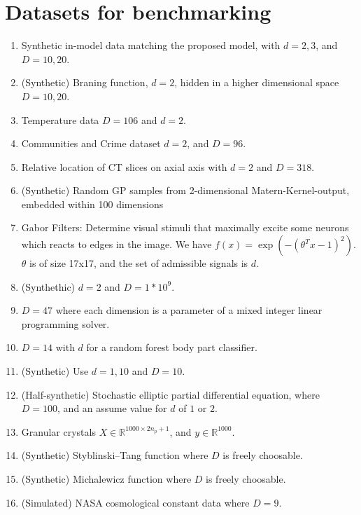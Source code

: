 \section{Datasets for benchmarking}

\begin{enumerate}
\item \citep{Garnett2013} Synthetic in-model data matching the proposed model, with $d=2, 3$, and $D=10, 20$.
\item \citep{Garnett2013} (Synthetic) Braning function, $d=2$, hidden in a higher dimensional space $D=10, 20$.
\item \citep{Garnett2013} Temperature data $D=106$ and $d=2$.
\item \citep{Garnett2013} Communities and Crime dataset $d=2$, and $D=96$. 
\item \citep{Garnett2013} Relative location of CT slices on axial axis with $d = 2$ and $D=318$. 
\item \citep{Djolonga2013} (Synthetic) Random GP samples from 2-dimensional Matern-Kernel-output, embedded within 100 dimensions
\item \citep{Djolonga2013} Gabor Filters: Determine visual stimuli that maximally excite some neurons which reacts to edges in the image.
We have $f(x) = \exp( -( \theta^T x - 1 )^2 )$. $\theta$ is of size 17x17, and the set of admissible signals is $d$.
\item \citep{Wang2013} (Synthethic) $d=2$ and $D=1*10^9$.
\item \citep{Wang2013} $D=47$ where each dimension is a parameter of a mixed integer linear programming solver.
\item \citep{Wang2013} $D=14$ with $d$ for a random forest body part classifier.
\item \citep{Tripathy}  (Synthetic) Use $d=1,10$ and $D=10$.
\item \citep{Tripathy} (Half-synthetic) Stochastic elliptic partial differential equation, where $D=100$, and an assume value for $d$ of $1$ or $2$.
\item \citep{Tripathy} Granular crystals $X \in \mathbb{R}^{1000 \times 2n_p +1}$, and $y \in \mathbb{R}^{1000}$.
\item \citep{Gardner2017} (Synthetic) Styblinski–Tang function where $D$ is freely choosable.
\item \citep{Gardner2017} (Synthetic) Michalewicz function where $D$ is freely choosable.
\item \citep{Gardner2017} (Simulated) NASA cosmological constant data where $D=9$.

\end{enumerate}
